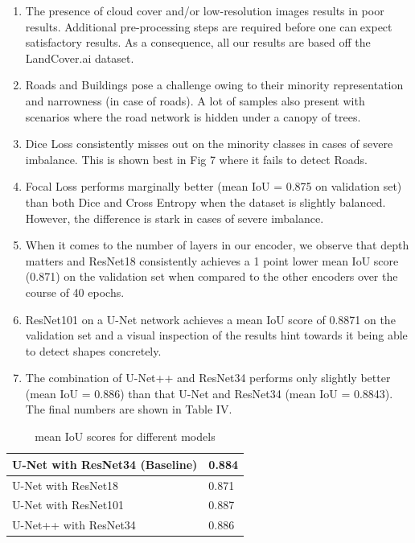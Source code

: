 \documentclass[conference]{IEEEtran}
\begin{document}
\begin{enumerate}
    \item The presence of cloud cover and/or low-resolution images results in poor results. Additional pre-processing steps are required before one can expect satisfactory results. As a consequence, all our results are based off the LandCover.ai dataset.
    \item Roads and Buildings pose a challenge owing to their minority representation and narrowness (in case of roads). A lot of samples also present with scenarios where the road network is hidden under a canopy of trees.
    \item Dice Loss consistently misses out on the minority classes in cases of severe imbalance. This is shown best in Fig 7 where it fails to detect Roads.
    \item Focal Loss performs marginally better (mean IoU = 0.875 on validation set) than both Dice and Cross Entropy when the dataset is slightly balanced. However, the difference is stark in cases of severe imbalance.
    \item When it comes to the number of layers in our encoder, we observe that depth matters and ResNet18 consistently achieves a 1 point lower mean IoU score (0.871) on the validation set when compared to the other encoders over the course of 40 epochs.
    \item ResNet101 on a U-Net network achieves a mean IoU score of 0.8871 on the validation set and a visual inspection of the results hint towards it being able to detect shapes concretely.
    \item The combination of U-Net++ and ResNet34 performs only slightly better (mean IoU = 0.886) than that U-Net and ResNet34 (mean IoU = 0.8843). The final numbers are shown in Table IV.
\end{enumerate}


\begin{table}[htbp]
\centering
\caption{mean IoU scores for different models}
\begin{tabular}{|p{3.9cm}|p{0.7cm}|}
 \hline 
 U-Net with ResNet34 (Baseline) &  0.884  \\ 
 \hline 
 U-Net with ResNet18  & 0.871  \\ 
 \hline 
 U-Net with ResNet101 & 0.887  \\ 
 \hline
  U-Net++ with ResNet34 & 0.886  \\ 
 \hline
\end{tabular}
\label{landcover_ai_classes}
\end{table}
\end{document}
